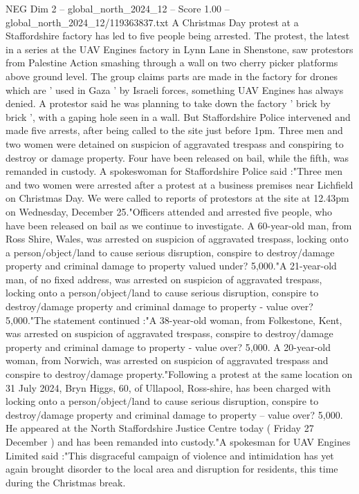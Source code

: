 \begin{textsample}{NEG Dim 2 – global\_north\_2024\_12 – Score 1.00 – global\_north\_2024\_12/119363837.txt}  \label{ex:f2_neg_267}
A Christmas Day protest at a Staffordshire factory has led to five people being arrested.
The protest, the latest in a series at the UAV Engines factory in Lynn Lane in Shenstone, saw protestors from Palestine Action smashing through a wall on two cherry picker platforms above ground level.
The group claims parts are made in the factory for drones which are ' used in Gaza ' by Israeli forces, something UAV Engines has always denied.
A protestor said he was planning to take down the factory ' brick by brick ', with a gaping hole seen in a wall.
But Staffordshire Police intervened and made five arrests, after being called to the site just before 1pm.
Three men and two women were detained on suspicion of aggravated trespass and conspiring to destroy or damage property.
Four have been released on bail, while the fifth, was remanded in custody.
A spokeswoman for Staffordshire Police said :"Three men and two women were arrested after a protest at a business premises near Lichfield on Christmas Day.
We were called to reports of protestors at the site at 12.43pm on Wednesday, December 25."Officers attended and arrested five people, who have been released on bail as we continue to investigate.
A 60-year-old man, from Ross Shire, Wales, was arrested on suspicion of aggravated trespass, locking onto a person/object/land to cause serious disruption, conspire to destroy/damage property and criminal damage to property valued under? 5,000."A 21-year-old man, of no fixed address, was arrested on suspicion of aggravated trespass, locking onto a person/object/land to cause serious disruption, conspire to destroy/damage property and criminal damage to property - value over? 5,000."The statement continued :"A 38-year-old woman, from Folkestone, Kent, was arrested on suspicion of aggravated trespass, conspire to destroy/damage property and criminal damage to property - value over? 5,000.
A 20-year-old woman, from Norwich, was arrested on suspicion of aggravated trespass and conspire to destroy/damage property."Following a protest at the same location on 31 July 2024, Bryn Higgs, 60, of Ullapool, Ross-shire, has been charged with locking onto a person/object/land to cause serious disruption, conspire to destroy/damage property and criminal damage to property -- value over? 5,000.
He appeared at the North Staffordshire Justice Centre today ( Friday 27 December ) and has been remanded into custody."A spokesman for UAV Engines Limited said :"This disgraceful campaign of violence and intimidation has yet again brought disorder to the local area and disruption for residents, this time during the Christmas break.

\end{textsample}
